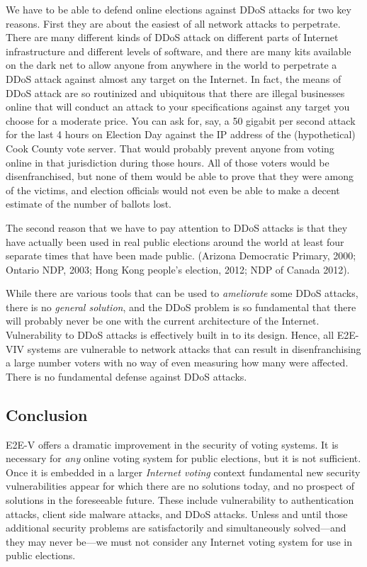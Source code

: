We have to be able to defend online elections against DDoS attacks for
two key reasons.  First they are about the easiest of all network
attacks to perpetrate. There are many different kinds of DDoS attack
on different parts of Internet infrastructure and different levels of
software, and there are many kits available on the dark net to allow
anyone from anywhere in the world to perpetrate a DDoS attack against
almost any target on the Internet. In fact, the means of DDoS attack
are so routinized and ubiquitous that there are illegal businesses
online that will conduct an attack to your specifications against any
target you choose for a moderate price. You can ask for, say, a 50
gigabit per second attack for the last 4 hours on Election Day against
the IP address of the (hypothetical) Cook County vote server. That
would probably prevent anyone from voting online in that jurisdiction
during those hours. All of those voters would be disenfranchised, but
none of them would be able to prove that they were among of the
victims, and election officials would not even be able to make a
decent estimate of the number of ballots lost.

The second reason that we have to pay attention to DDoS attacks is
that they have actually been used in real public elections around the
world at least four separate times that have been made
public. (Arizona Democratic Primary, 2000; Ontario NDP, 2003; Hong
Kong people's election, 2012; NDP of Canada 2012).

While there are various tools that can be used to \emph{ameliorate}
some DDoS attacks, there is no \emph{general solution}, and the DDoS
problem is so fundamental that there will probably never be one with
the current architecture of the Internet. Vulnerability to DDoS
attacks is effectively built in to its design. Hence, all E2E-VIV
systems are vulnerable to network attacks that can result in
disenfranchising a large number voters with no way of even measuring
how many were affected. There is no fundamental defense against DDoS
attacks.

\subsection{Conclusion}

E2E-V offers a dramatic improvement in the security of voting
systems. It is necessary for \emph{any} online voting system for
public elections, but it is not sufficient. Once it is embedded in a
larger \emph{Internet voting} context fundamental new security
vulnerabilities appear for which there are no solutions today, and no
prospect of solutions in the foreseeable future. These include
vulnerability to authentication attacks, client side malware attacks,
and DDoS attacks. Unless and until those additional security problems
are satisfactorily and simultaneously solved---and they may never
be---we must not consider any Internet voting system for use in public
elections.
